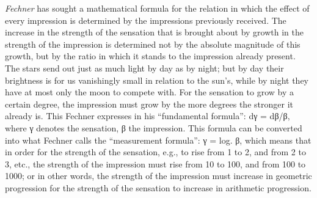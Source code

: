 \documentclass[12pt,a4paper]{book}
\newcommand{\opage}[1]{\marginnote{\footnotesize\textit{[#1]}}}
\begin{document}
\emph{Fechner} has sought a mathematical formula for the relation in
which the effect of every impression is determined by the impressions
previously received. The increase in the strength of the sensation that
is brought about by growth in the strength of the impression is
determined not by the absolute magnitude of this growth, but by the
ratio in which it stands to the impression already present. The stars
send out just as much light by day as by night; but by day their
brightness is for us vanishingly small in relation to the sun's, while
by night they have at most only the moon to compete with. For the
sensation to grow by a certain degree, the impression must grow by the
more degrees the stronger it already is. This
\opage{133}Fechner expresses in his ``fundamental formula'': dγ = dβ/β,
where γ denotes the sensation, β the impression. This formula can be
converted into what Fechner calls the ``measurement formula'': γ = log.
β, which means that in order for the strength of the sensation, e.g., to
rise from 1 to 2, and from 2 to 3, etc., the strength of the impression
must rise from 10 to 100, and from 100 to 1000; or in other words, the
strength of the impression must increase in geometric progression for
the strength of the sensation to increase in arithmetic progression.
\end{document}
